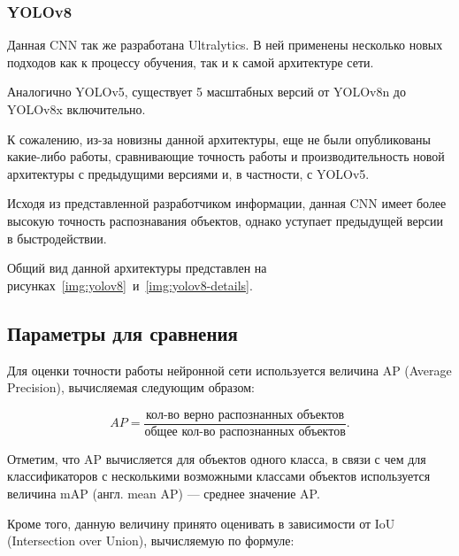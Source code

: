 

\subsubsection{YOLOv8}

Данная CNN так же разработана Ultralytics. В ней применены несколько новых подходов как к процессу обучения, так и к самой архитектуре сети.

Аналогично YOLOv5, существует 5 масштабных версий от YOLOv8n до YOLOv8x включительно.

К сожалению, из-за новизны данной архитектуры, еще не были опубликованы какие-либо работы, сравнивающие точность работы и производительность новой архитектуры с предыдущими версиями и, в частности, с YOLOv5.

Исходя из представленной разработчиком информации, данная CNN имеет более высокую точность распознавания объектов, однако уступает предыдущей версии в быстродействии.

Общий вид данной архитектуры представлен на рисунках~\ref{img:yolov8}~и~\ref{img:yolov8-details}.




\subsection{Параметры для сравнения}

Для оценки точности работы нейронной сети используется величина AP (Average Precision), вычисляемая следующим образом:

\begin{equation}
	AP = \frac{\text{кол-во верно распознанных объектов}}{\text{общее кол-во распознанных объектов}}.
\end{equation}

Отметим, что AP вычисляется для объектов одного класса, в связи с чем для классификаторов с несколькими возможными классами объектов используется величина mAP (англ. mean AP) --- среднее значение AP.

Кроме того, данную величину принято оценивать в зависимости от IoU (Intersection over Union), вычисляемую по формуле:

